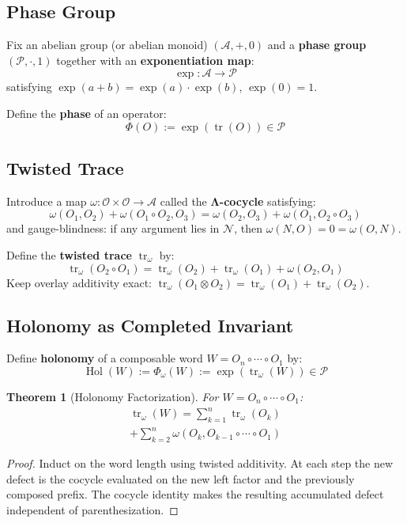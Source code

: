 \documentclass[12pt, oneside]{article}
\newtheorem{theorem}{Theorem}[section]
\DeclareMathOperator{\tr}{tr}
\DeclareMathOperator{\Hol}{Hol}
\newcommand{\N}{\mathcal{N}}
\newcommand{\A}{\mathcal{A}}
\newcommand{\Opr}{\mathcal{O}}
\begin{document}
\subsection{Phase Group}

Fix an abelian group (or abelian monoid) $(\A, +, 0)$ and a \textbf{phase group} $(\mathcal{P}, \cdot, 1)$ together with an \textbf{exponentiation map}:
\begin{equation}
\exp: \A \rightarrow \mathcal{P}
\end{equation}
satisfying $\exp(a + b) = \exp(a) \cdot \exp(b)$, $\exp(0) = 1$.

Define the \textbf{phase} of an operator:
\begin{equation}
\Phi(O) := \exp(\tr(O)) \in \mathcal{P}
\end{equation}

\subsection{Twisted Trace}

Introduce a map $\omega: \Opr \times \Opr \rightarrow \A$ called the \textbf{Λ-cocycle} satisfying:
\begin{equation}
\omega(O_1, O_2) + \omega(O_1 \circ O_2, O_3) = \omega(O_2, O_3) + \omega(O_1, O_2 \circ O_3)
\end{equation}
and gauge-blindness: if any argument lies in $\N$, then $\omega(N, O) = 0 = \omega(O, N)$.

Define the \textbf{twisted trace} $\tr_\omega$ by:
\begin{equation}
\tr_\omega(O_2 \circ O_1) = \tr_\omega(O_2) + \tr_\omega(O_1) + \omega(O_2, O_1)
\end{equation}
Keep overlay additivity exact: $\tr_\omega(O_1 \otimes O_2) = \tr_\omega(O_1) + \tr_\omega(O_2)$.

\subsection{Holonomy as Completed Invariant}

Define \textbf{holonomy} of a composable word $W = O_n \circ \cdots \circ O_1$ by:
\begin{equation}
\Hol(W) := \Phi_\omega(W) := \exp(\tr_\omega(W)) \in \mathcal{P}
\end{equation}

\begin{theorem}[Holonomy Factorization]
For $W = O_n \circ \cdots \circ O_1$:
\begin{multline}
\tr_\omega(W) = \sum_{k=1}^n \tr_\omega(O_k) \\
+ \sum_{k=2}^{n} \omega(O_k, O_{k-1} \circ \cdots \circ O_1)
\end{multline}
\end{theorem}
\begin{proof}
Induct on the word length using twisted additivity. At each step the new defect is the cocycle evaluated on the new left factor and the previously composed prefix. The cocycle identity makes the resulting accumulated defect independent of parenthesization.
\end{proof}
\end{document}
